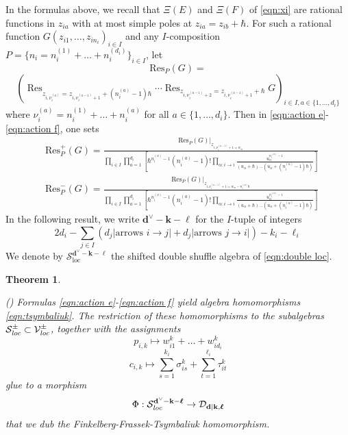 \documentclass{amsart}
\newtheorem{theorem}{Theorem}[section]
\def\DD{{\mathcal{D}}}
\def\CS{{\mathcal{S}}}
\def\CV{{\mathcal{V}}}
\def\bd{{\mathbf{d}}}
\def\bk{{\mathbf{k}}}
\def\bell{\boldsymbol{\ell}}
\def\eTs{\Phi}
\begin{document}
In the formulas above, we recall that $\Xi(E)$ and $\Xi(F)$ of \eqref{eqn:xi} are rational functions in $z_{ia}$ with at most simple poles at $z_{ia} = z_{ib} + \hbar$. For such a rational function $G(z_{i1},\dots,z_{in_i})_{i \in I}$ and any $I$-composition $P = \{n_i = n_i^{(1)}+ \dots + n_i^{(d_i)}\}_{i \in I}$, let
\begin{equation}
\label{eqn:residue}
\text{Res}_P(G) = 
\end{equation}
$$
\left( \mathop{\text{Res}}_{z_{i,\nu_i^{(a)}} = z_{i,\nu_i^{(a-1)}+1} + (n_i^{(a)}-1)\hbar} \cdots \mathop{\text{Res}}_{z_{i,\nu_i^{(a-1)}+2} = z_{i,\nu_i^{(a-1)}+1}+\hbar} G \right)_{i \in I, a \in \{1,\dots, d_i\}}
$$
where $\nu_i^{(a)} = n_i^{(1)}+\dots+n_i^{(a)}$ for all $a \in \{1,\dots,d_i\}$. Then in \eqref{eqn:action e}-\eqref{eqn:action f}, one sets
\begin{align*}
&\text{Res}^+_P(G) = \frac {\text{Res}_P(G)|_{z_{i,\nu_i^{(a-1)}+1 = w_{ia}}}}{\prod_{i \in I} \prod_{a=1}^{d_i} \left[ \hbar^{n_i^{(a)}-1}(n_i^{(a)}-1)!  \prod_{\alpha : i \rightarrow i} \frac {u_\alpha^{n_i^{(a)}-1}}{(u_{\alpha}+\hbar)\dots (u_{\alpha}+(n_i^{(a)}-1)\hbar)}\right]} \\
&\text{Res}^-_P(G) = \frac {\text{Res}_P(G)|_{z_{i,\nu_i^{(a-1)}+1 = w_{ia} -n_i^{(a)}\hbar}}}{\prod_{i \in I} \prod_{a=1}^{d_i} \left[ \hbar^{n_i^{(a)}-1}(n_i^{(a)}-1)!  \prod_{\alpha : i \rightarrow i} \frac {u_\alpha^{n_i^{(a)}-1}}{(u_{\alpha}+\hbar)\dots (u_{\alpha}+(n_i^{(a)}-1)\hbar)}\right]}
\end{align*}
In the following result, we write $\bd^\vee - \bk - \bell$ for the $I$-tuple of integers
$$
2d_i -  \sum_{j \in I} \left(d_j \Big|\text{arrows }i \rightarrow j\Big| + d_j \Big|\text{arrows }j \rightarrow i\Big|\right) - k_i - \ell_i
$$
We denote by $\CS^{\bd^\vee-\bk-\bell}_{\text{loc}}$ the shifted double shuffle algebra of \eqref{eqn:double loc}.

\medskip 

\begin{theorem}
\label{thm:tsymbaliuk}

(\cite{FT, FrT, Tsymbaliuk}) Formulas \eqref{eqn:action e}-\eqref{eqn:action f} yield algebra homomorphisms \eqref{eqn:tsymbaliuk}. The restriction of these homomorphisms to the subalgebras $\CS^\pm_{\emph{loc}} \subset \CV^\pm_{\emph{loc}}$, together with the assignments
\begin{equation}
\label{eqn:assignment 1}
p_{i,k} \mapsto w_{i1}^k+\dots + w_{id_i}^k
\end{equation}
\begin{equation}
\label{eqn:assignment 2}
c_{i,k} \mapsto \sum_{s=1}^{k_i} \sigma_{is}^k + \sum_{t=1}^{\ell_i} \tau_{it}^k 
\end{equation}
glue to a morphism 
\begin{equation}
\label{eqn:tsymbaliuk theorem}
\eTs : \CS^{\bd^\vee-\bk-\bell}_{\emph{loc}} \rightarrow \DD_{\bd|\bk,\bell} 
\end{equation}
that we dub the \emph{Finkelberg-Frassek-Tsymbaliuk homomorphism}. 

\end{theorem}
\end{document}
